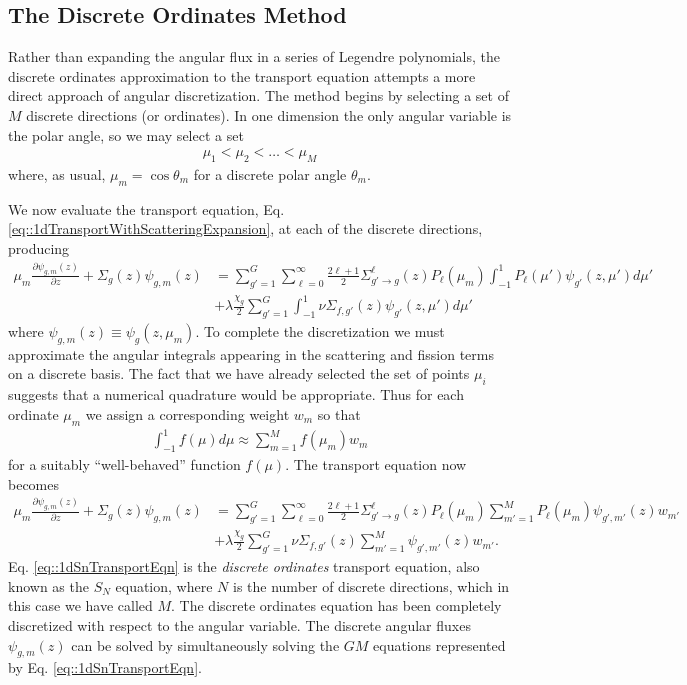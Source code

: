\documentclass[11pt]{article}
\begin{document}
\subsection{The Discrete Ordinates Method}
\label{sec:orgheadline13}
Rather than expanding the angular flux in a series of Legendre polynomials, the discrete ordinates approximation to the transport equation attempts a more direct approach of angular discretization.  The method begins by selecting a set of \(M\) discrete directions (or ordinates).  In one dimension the only angular variable is the polar angle, so we may select a set
\begin{align*}
  \mu_1 < \mu_2 < \hdots < \mu_{M}
\end{align*}
where, as usual, \(\mu_m = \cos\theta_m\) for a discrete polar angle \(\theta_m\).

We now evaluate the transport equation, Eq. \eqref{eq::1dTransportWithScatteringExpansion}, at each of the discrete directions, producing
\begin{align}
  \mu_m \frac{\partial \psi_{g,m}(z)}{\partial z}
  + \Sigma_g(z) \psi_{g,m}(z)
  &= \sum_{g'=1}^G \sum_{\ell=0}^\infty \frac{2\ell+1}{2} \Sigma_{g' \rightarrow g}^\ell(z) P_\ell(\mu_m) \int_{-1}^1 P_\ell(\mu') \psi_{g'}(z,\mu') d\mu' \\
  &+ \lambda\frac{\chi_g}{2} \sum_{g'=1}^G \int_{-1}^1 \nu\Sigma_{f,g'}(z) \psi_{g'}(z,\mu') d\mu'
\end{align}
where \(\psi_{g,m}(z) \equiv \psi_g(z,\mu_m)\).  To complete the discretization we must approximate the angular integrals appearing in the scattering and fission terms on a discrete basis.  The fact that we have already selected the set of points \(\mu_i\) suggests that a numerical quadrature would be appropriate.  Thus for each ordinate \(\mu_m\) we assign a corresponding weight \(w_m\) so that
\begin{align*}
  \int_{-1}^1 f(\mu) d\mu \approx \sum_{m=1}^M f(\mu_m) w_m
\end{align*}
for a suitably ``well-behaved'' function \(f(\mu)\).  The transport equation now becomes
\begin{align}
  \mu_m \frac{\partial \psi_{g,m}(z)}{\partial z}
  + \Sigma_g(z) \psi_{g,m}(z)
  &= \sum_{g'=1}^G \sum_{\ell=0}^\infty \frac{2\ell+1}{2} \Sigma_{g' \rightarrow g}^\ell(z) P_\ell(\mu_m) \sum_{m'=1}^M P_\ell(\mu_m) \psi_{g',m'}(z) w_{m'} \\
  &+ \lambda\frac{\chi_g}{2} \sum_{g'=1}^G \nu\Sigma_{f,g'}(z) \sum_{m'=1}^M  \psi_{g',m'}(z) w_{m'}.
  \label{eq::1dSnTransportEqn}
\end{align}
Eq. \eqref{eq::1dSnTransportEqn} is the \emph{discrete ordinates} transport equation, also known as the \(S_N\) equation, where \(N\) is the number of discrete directions, which in this case we have called \(M\).  The discrete ordinates equation has been completely discretized with respect to the angular variable.  The discrete angular fluxes \(\psi_{g,m}(z)\) can be solved by simultaneously solving the \(GM\) equations represented by Eq. \eqref{eq::1dSnTransportEqn}.
\end{document}

